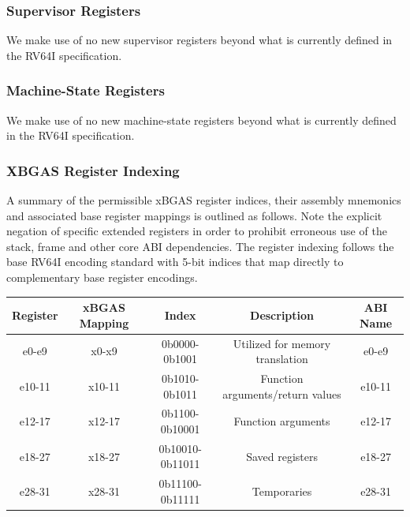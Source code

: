 \documentclass{article}
\begin{document}
\subsubsection{Supervisor Registers}

We make use of no new supervisor registers beyond what is 
currently defined in the RV64I specification.  

\subsubsection{Machine-State Registers}

We make use of no new machine-state registers beyond what is 
currently defined in the RV64I specification.  

\newpage
\subsubsection{XBGAS Register Indexing}
A summary of the permissible xBGAS register indices, their assembly 
mnemonics and associated base register mappings is outlined as follows.  
Note the explicit negation of specific extended registers in order to prohibit 
erroneous use of the stack, frame and other core ABI dependencies.  The register 
indexing follows the base RV64I encoding standard with 5-bit indices that 
map directly to complementary base register encodings.  

\begin{center}
\begin{tabular}{| c | c | c | c | c |}
\hline
Register & xBGAS Mapping & Index & Description & ABI Name\\ \hline
\hline
e0-e9 & x0-x9 & 0b0000-0b1001 & Utilized for memory translation & e0-e9\\
\hline
e10-11 & x10-11 & 0b1010-0b1011 & Function arguments/return values & e10-11\\
\hline
e12-17 & x12-17 & 0b1100-0b10001 & Function arguments & e12-17\\
\hline
e18-27 & x18-27 & 0b10010-0b11011 & Saved registers & e18-27\\
\hline
e28-31 & x28-31 & 0b11100-0b11111 & Temporaries & e28-31\\
\hline
\end{tabular}
\end{center}

\newpage
\end{document}
